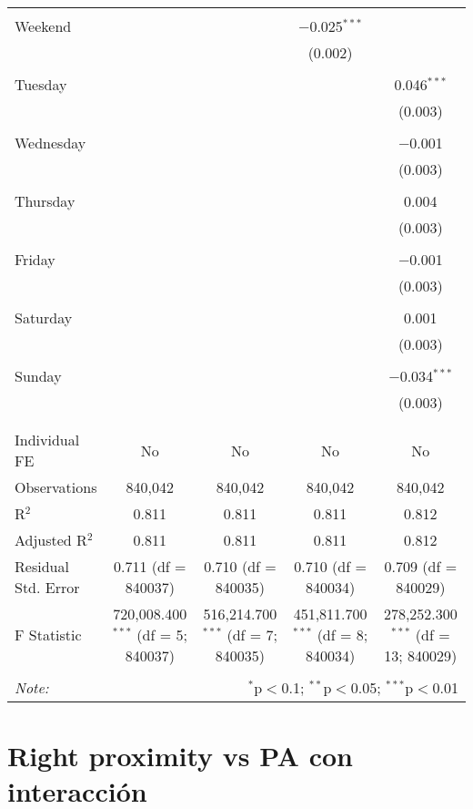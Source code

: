 \documentclass[
]{article}
\begin{document}
\begin{table}[!htbp]
{\begin{tabular}{@{\extracolsep{5pt}}lcccc}
  & & & & \\ 
 Weekend &  &  & $-$0.025$^{***}$ &  \\ 
  &  &  & (0.002) &  \\ 
  & & & & \\ 
 Tuesday &  &  &  & 0.046$^{***}$ \\ 
  &  &  &  & (0.003) \\ 
  & & & & \\ 
 Wednesday &  &  &  & $-$0.001 \\ 
  &  &  &  & (0.003) \\ 
  & & & & \\ 
 Thursday &  &  &  & 0.004 \\ 
  &  &  &  & (0.003) \\ 
  & & & & \\ 
 Friday &  &  &  & $-$0.001 \\ 
  &  &  &  & (0.003) \\ 
  & & & & \\ 
 Saturday &  &  &  & 0.001 \\ 
  &  &  &  & (0.003) \\ 
  & & & & \\ 
 Sunday &  &  &  & $-$0.034$^{***}$ \\ 
  &  &  &  & (0.003) \\ 
  & & & & \\ 
\hline \\[-1.8ex] 
Individual FE & No & No & No & No \\ 
Observations & 840,042 & 840,042 & 840,042 & 840,042 \\ 
R$^{2}$ & 0.811 & 0.811 & 0.811 & 0.812 \\ 
Adjusted R$^{2}$ & 0.811 & 0.811 & 0.811 & 0.812 \\ 
Residual Std. Error & 0.711 (df = 840037) & 0.710 (df = 840035) & 0.710 (df = 840034) & 0.709 (df = 840029) \\ 
F Statistic & 720,008.400$^{***}$ (df = 5; 840037) & 516,214.700$^{***}$ (df = 7; 840035) & 451,811.700$^{***}$ (df = 8; 840034) & 278,252.300$^{***}$ (df = 13; 840029) \\ 
\hline 
\hline \\[-1.8ex] 
\textit{Note:}  & \multicolumn{4}{r}{$^{*}$p$<$0.1; $^{**}$p$<$0.05; $^{***}$p$<$0.01} \\ 
\end{tabular}
} 
\end{table} 
\newpage
\section{Right proximity vs PA con interacción}
\end{document}
